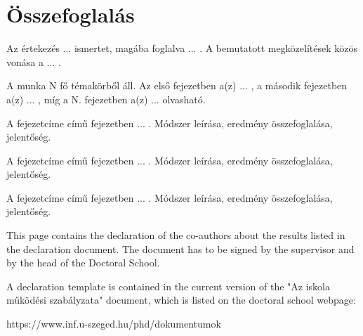 \documentclass[12pt,a4paper]{extarticle}
\begin{document}
\newpage

\section{Összefoglalás}

Az értekezés ... ismertet, magába foglalva ... . A bemutatott megközelítések közös vonása a ... .

A munka N fő témakörből áll. Az első fejezetben a(z) ... , a második fejezetben a(z) ... , míg a N. fejezetben a(z) ... olvasható.

A fejezetcíme című fejezetben ... . Módszer leírása, eredmény összefoglalása, jelentőség.

A fejezetcíme című fejezetben ... . Módszer leírása, eredmény összefoglalása, jelentőség.

A fejezetcíme című fejezetben ... . Módszer leírása, eredmény összefoglalása, jelentőség.


\newpage


\newpage

This page contains the declaration of the co-authors about the results listed in the declaration document. The document has to be signed by the supervisor and by the head of the Doctoral School. 

A declaration template is contained in the current version of the "Az iskola működési szabályzata" document, which is listed on the doctoral school webpage:

https://www.inf.u-szeged.hu/phd/dokumentumok


\newpage
\thispagestyle{empty}
\mbox{}
\newpage
\end{document}
